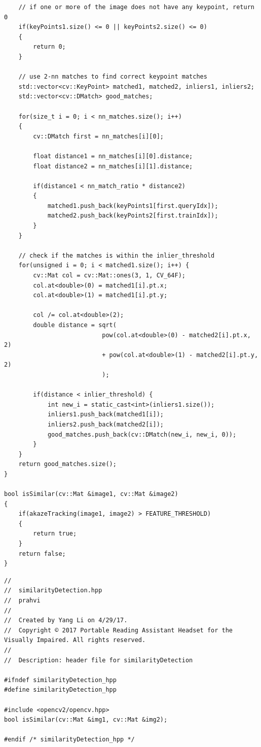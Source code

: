 \begin{lstlisting}
	// if one or more of the image does not have any keypoint, return 0
	if(keyPoints1.size() <= 0 || keyPoints2.size() <= 0)
	{
		return 0;
	}
	
	// use 2-nn matches to find correct keypoint matches
	std::vector<cv::KeyPoint> matched1, matched2, inliers1, inliers2;
	std::vector<cv::DMatch> good_matches;
	
	for(size_t i = 0; i < nn_matches.size(); i++)
	{
		cv::DMatch first = nn_matches[i][0];
		
		float distance1 = nn_matches[i][0].distance;
		float distance2 = nn_matches[i][1].distance;
		
		if(distance1 < nn_match_ratio * distance2)
		{
			matched1.push_back(keyPoints1[first.queryIdx]);
			matched2.push_back(keyPoints2[first.trainIdx]);
		}
	}
	
	// check if the matches is within the inlier_threshold
	for(unsigned i = 0; i < matched1.size(); i++) {
		cv::Mat col = cv::Mat::ones(3, 1, CV_64F);
		col.at<double>(0) = matched1[i].pt.x;
		col.at<double>(1) = matched1[i].pt.y;
		
		col /= col.at<double>(2);
		double distance = sqrt(
						   pow(col.at<double>(0) - matched2[i].pt.x, 2)
						   + pow(col.at<double>(1) - matched2[i].pt.y, 2)
						   );
		
		if(distance < inlier_threshold) {
			int new_i = static_cast<int>(inliers1.size());
			inliers1.push_back(matched1[i]);
			inliers2.push_back(matched2[i]);
			good_matches.push_back(cv::DMatch(new_i, new_i, 0));
		}
	}
	return good_matches.size();
}

bool isSimilar(cv::Mat &image1, cv::Mat &image2)
{
	if(akazeTracking(image1, image2) > FEATURE_THRESHOLD)
	{
		return true;
	}
	return false;
}

\end{lstlisting}

\begin{lstlisting}
//
//  similarityDetection.hpp
//  prahvi
//
//  Created by Yang Li on 4/29/17.
//  Copyright © 2017 Portable Reading Assistant Headset for the Visually Impaired. All rights reserved.
//
//	Description: header file for similarityDetection

#ifndef similarityDetection_hpp
#define similarityDetection_hpp

#include <opencv2/opencv.hpp>
bool isSimilar(cv::Mat &img1, cv::Mat &img2);

#endif /* similarityDetection_hpp */

\end{lstlisting}



